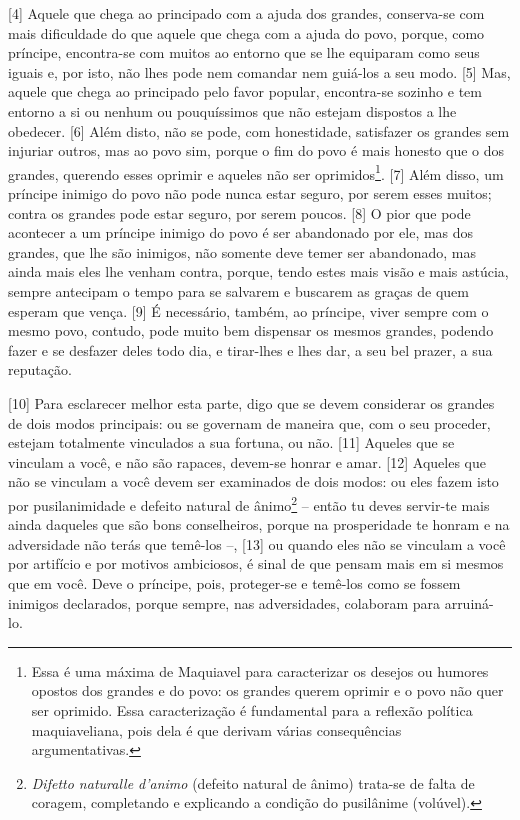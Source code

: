 {[}4{]} Aquele que chega ao principado com a ajuda dos grandes,
conserva-se com mais dificuldade do que aquele que chega com a ajuda do
povo, porque, como príncipe, encontra-se com muitos ao entorno que se
lhe equiparam como seus iguais e, por isto, não lhes pode nem comandar
nem guiá-los a seu modo. {[}5{]} Mas, aquele que chega ao principado
pelo favor popular, encontra-se sozinho e tem entorno a si ou nenhum ou
pouquíssimos que não estejam dispostos a lhe obedecer. {[}6{]} Além
disto, não se pode, com honestidade, satisfazer os grandes sem injuriar
outros, mas ao povo sim, porque o fim do povo é mais honesto que o dos
grandes, querendo esses oprimir e aqueles não ser oprimidos\footnote{Essa
  é uma máxima de Maquiavel para caracterizar os desejos ou humores
  opostos dos grandes e do povo: os grandes querem oprimir e o povo não
  quer ser oprimido. Essa caracterização é fundamental para a reflexão
  política maquiaveliana, pois dela é que derivam várias consequências
  argumentativas.}. {[}7{]} Além disso, um príncipe inimigo do povo não
pode nunca estar seguro, por serem esses muitos; contra os grandes pode
estar seguro, por serem poucos. {[}8{]} O pior que pode acontecer a um
príncipe inimigo do povo é ser abandonado por ele, mas dos grandes, que
lhe são inimigos, não somente deve temer ser abandonado, mas ainda mais
eles lhe venham contra, porque, tendo estes mais visão e mais astúcia,
sempre antecipam o tempo para se salvarem e buscarem as graças de quem
esperam que vença. {[}9{]} É necessário, também, ao príncipe, viver
sempre com o mesmo povo, contudo, pode muito bem dispensar os mesmos
grandes, podendo fazer e se desfazer deles todo dia, e tirar-lhes e lhes
dar, a seu bel prazer, a sua reputação.

{[}10{]} Para esclarecer melhor esta parte, digo que se devem considerar
os grandes de dois modos principais: ou se governam de maneira que, com
o seu proceder, estejam totalmente vinculados a sua fortuna, ou não.
{[}11{]} Aqueles que se vinculam a você, e não são rapaces, devem-se
honrar e amar. {[}12{]} Aqueles que não se vinculam a você devem ser
examinados de dois modos: ou eles fazem isto por pusilanimidade e
defeito natural de ânimo\footnote{\emph{Difetto naturalle d'animo}
  (defeito natural de ânimo) trata-se de falta de coragem, completando e
  explicando a condição do pusilânime (volúvel).} -- então tu deves
servir-te mais ainda daqueles que são bons conselheiros, porque na
prosperidade te honram e na adversidade não terás que temê-los --,
{[}13{]} ou quando eles não se vinculam a você por artifício e por
motivos ambiciosos, é sinal de que pensam mais em si mesmos que em você.
Deve o príncipe, pois, proteger-se e temê-los como se fossem inimigos
declarados, porque sempre, nas adversidades, colaboram para arruiná- lo.

